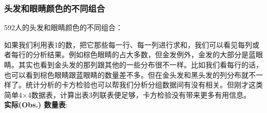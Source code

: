 \hypertarget{ux5934ux53d1ux548cux773cux775bux989cux8272ux7684ux4e0dux540cux7ec4ux5408}{%
\subsubsection{头发和眼睛颜色的不同组合}\label{ux5934ux53d1ux548cux773cux775bux989cux8272ux7684ux4e0dux540cux7ec4ux5408}}

592人的头发和眼睛颜色的不同组合：



如果我们利用表1的数，把它那些每一行、每一列进行求和，我们可以看见每列或者每行的分析结果。例如棕色眼睛的占大多数，但金发例外，金发的大部分是蓝眼睛。其实也看到金头发的那列跟其他的一些分布很不一样。比如我们看每行的话，也可以看到棕色眼睛跟蓝眼睛的数量差不多。但在金头发和黑头发的列分布就不一样了。统计分析的卡方检验也可以帮我们分析分组数据间有没有相关。但刚才这类简单4×4数据表，计算出表3列联表便足够，卡方检验没有带来更多有用信息。\\
\textbf{实际(Obs.) 数量表}:



